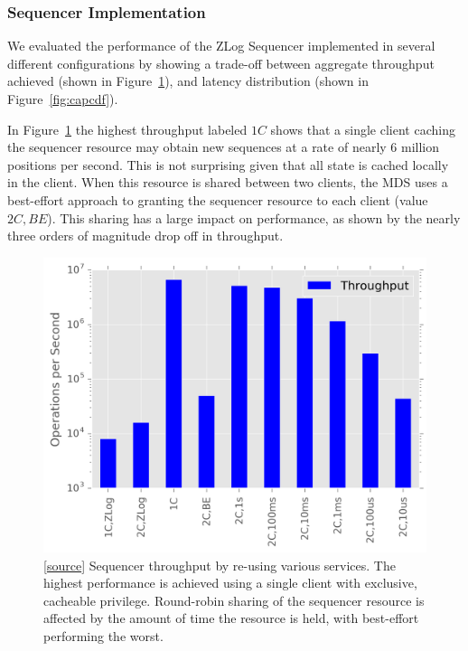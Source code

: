\documentclass[preprint]{sigplanconf-eurosys}
\begin{document}
\subsubsection{Sequencer Implementation}

We evaluated the performance of the ZLog Sequencer implemented in several
different configurations by showing a trade-off between aggregate throughput
achieved (shown in Figure~\ref{fig:captp}), and latency distribution (shown in
Figure~\ref{fig:capcdf}).

In Figure~\ref{fig:captp} the highest throughput labeled $1C$ shows that a
single client caching the sequencer resource may obtain new sequences at a rate
of nearly 6 million positions per second. This is not surprising given that all
state is cached locally in the client. When this resource is shared between two
clients, the MDS uses a best-effort approach to granting the sequencer resource
to each client (value $2C,BE$). This sharing has a large impact on performance,
as shown by the nearly three orders of magnitude drop off in throughput.

\begin{figure}[h]
\centering
\includegraphics{figures/caps-delay-thruput.png}
\caption{[\href{https://github.com/double-blind-submitter/osdi16}{source}]
Sequencer throughput by re-using various services.  The highest performance is
achieved using a single client with exclusive, cacheable privilege. Round-robin
sharing of the sequencer resource is affected by the amount of time the
resource is held, with best-effort performing the worst.}
\label{fig:captp}
\end{figure}
\end{document}
